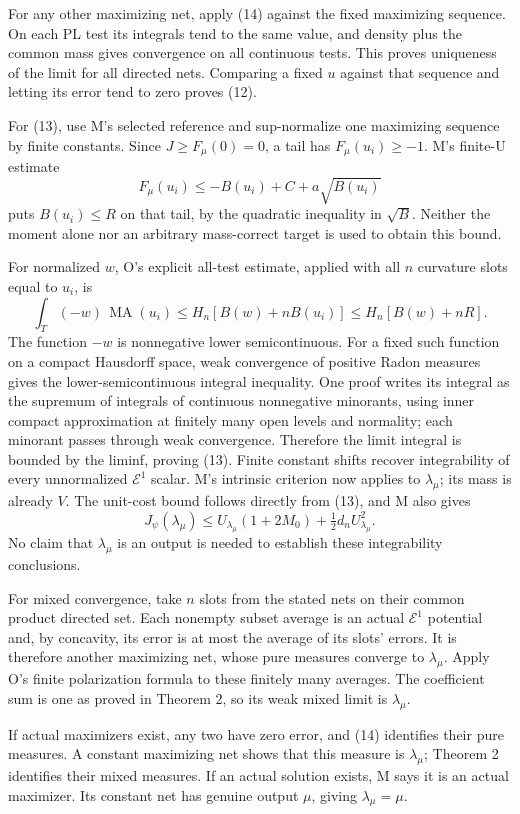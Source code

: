 \documentclass[
  11pt,
]{article}
\begin{document}
For any other maximizing net, apply (14) against the fixed maximizing
sequence. On each PL test its integrals tend to the same value, and
density plus the common mass gives convergence on all continuous tests.
This proves uniqueness of the limit for all directed nets. Comparing a
fixed \(u\) against that sequence and letting its error tend to zero
proves (12).

For (13), use M's selected reference and sup-normalize one maximizing
sequence by finite constants. Since \(J\geq F_\mu(0)=0\), a tail has
\(F_\mu(u_i)\geq-1\). M's finite-U estimate \[
 F_\mu(u_i)\leq-B(u_i)+C+a\sqrt{B(u_i)}
\] puts \(B(u_i)\leq R\) on that tail, by the quadratic inequality in
\(\sqrt B\). Neither the moment alone nor an arbitrary mass-correct
target is used to obtain this bound.

For normalized \(w\), O's explicit all-test estimate, applied with all
\(n\) curvature slots equal to \(u_i\), is \[
 \int_T(-w)\,\operatorname{MA}(u_i)
                  \leq H_n[B(w)+nB(u_i)]\leq H_n[B(w)+nR].
\] The function \(-w\) is nonnegative lower semicontinuous. For a fixed
such function on a compact Hausdorff space, weak convergence of positive
Radon measures gives the lower-semicontinuous integral inequality. One
proof writes its integral as the supremum of integrals of continuous
nonnegative minorants, using inner compact approximation at finitely
many open levels and normality; each minorant passes through weak
convergence. Therefore the limit integral is bounded by the liminf,
proving (13). Finite constant shifts recover integrability of every
unnormalized \(\mathcal E^1\) scalar. M's intrinsic criterion now
applies to \(\lambda_\mu\); its mass is already \(V\). The unit-cost
bound follows directly from (13), and M also gives \[
 J_\psi(\lambda_\mu)\leq U_{\lambda_\mu}(1+2M_0)
                       +\tfrac12d_n U_{\lambda_\mu}^2.
\] No claim that \(\lambda_\mu\) is an output is needed to establish
these integrability conclusions.

For mixed convergence, take \(n\) slots from the stated nets on their
common product directed set. Each nonempty subset average is an actual
\(\mathcal E^1\) potential and, by concavity, its error is at most the
average of its slots' errors. It is therefore another maximizing net,
whose pure measures converge to \(\lambda_\mu\). Apply O's finite
polarization formula to these finitely many averages. The coefficient
sum is one as proved in Theorem 2, so its weak mixed limit is
\(\lambda_\mu\).

If actual maximizers exist, any two have zero error, and (14) identifies
their pure measures. A constant maximizing net shows that this measure
is \(\lambda_\mu\); Theorem 2 identifies their mixed measures. If an
actual solution exists, M says it is an actual maximizer. Its constant
net has genuine output \(\mu\), giving \(\lambda_\mu=\mu\).
\end{document}
